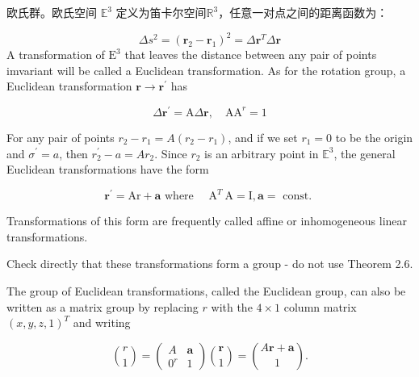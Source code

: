 \begin{eg}
    欧氏群。欧氏空间 $\mathbb{E}^{3}$ 定义为笛卡尔空间$\mathbb{R}^{3}$，任意一对点之间的距离函数为：

$$
\Delta s^{2}=\left(\mathbf{r}_{2}-\mathbf{r}_{1}\right)^{2}=\Delta \mathbf{r}^{T} \Delta \mathbf{r}
$$
A transformation of $\mathrm{E}^3$ that leaves the distance between any pair of points imvariant will be called a Euclidean transformation. As for the rotation group, a Euclidean transformation $\mathbf{r} \rightarrow \mathbf{r}^{\prime}$ has

$$
\Delta \mathbf{r}^{\prime}=\mathrm{A} \Delta \mathbf{r}, \quad \mathrm{AA}^r=1
$$


For any pair of points $r_2-r_1=A\left(r_2-r_1\right)$, and if we set $r_1=0$ to be the origin and $\sigma^{\prime}=a$, then $r_2^{\prime}-a=A r_2$. Since $r_2$ is an arbitrary point in $\mathbb{E}^3$, the general Euclidean transformations have the form

$$
\mathbf{r}^{\prime}=\mathrm{Ar}+\mathbf{a} \text { where } \quad \mathrm{A}^T \mathrm{~A}=\mathrm{I}, \mathbf{a}=\text { const. }
$$


Transformations of this form are frequently called affine or inhomogeneous linear transformations.
\end{eg}
\begin{exercise}
    Check directly that these transformations form a group - do not use Theorem 2.6.
\end{exercise}

The group of Euclidean transformations, called the Euclidean group, can also be written as a matrix group by replacing $r$ with the $4 \times 1$ column matrix $(x, y, z, 1)^T$ and writing

$$
\binom{r}{1}=\left(\begin{array}{cc}
A & \mathbf{a} \\
0^r & 1
\end{array}\right)\binom{\mathbf{r}}{1}=\binom{A \mathbf{r}+\mathbf{a}}{1} .
$$


